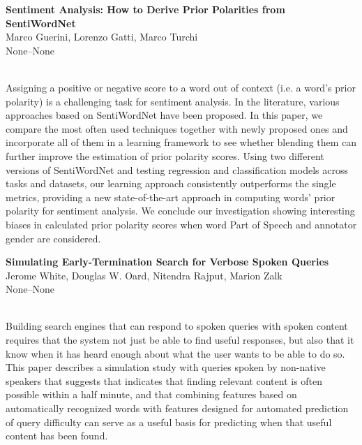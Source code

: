 \documentclass[twoside,makeidx]{book}
\renewcommand{\normalsize}{\fontsize{8}{9}\selectfont}
\renewcommand{\small}{\fontsize{7}{8}\selectfont}
\begin{document}
\begin{minipage}{\linewidth}%
\begin{center}
\textbf{\normalsize Sentiment Analysis: How to Derive Prior Polarities from SentiWordNet}\\
\normalsize  Marco Guerini,  Lorenzo Gatti,  Marco Turchi\\
{\small None--None}\\
\end{center}
\end{minipage}\\[0.5em]
\nopagebreak%
\noindent%
{\small Assigning a positive or negative score to a word out of context (i.e. a word's prior polarity) is a challenging task for sentiment analysis. In the literature, various approaches based on SentiWordNet have been proposed.  In this paper, we compare the most often used techniques together with newly proposed ones and incorporate all of them in a learning framework to see whether blending them can further improve the estimation of prior polarity scores.  Using two different versions of SentiWordNet and testing regression and classification models across tasks and datasets, our learning approach consistently outperforms the single metrics, providing a new state-of-the-art approach in computing words' prior polarity for sentiment analysis. We conclude our investigation showing interesting biases in calculated prior polarity scores when word Part of Speech and annotator gender are considered.}
\par\vspace{2em}\noindent%
\begin{minipage}{\linewidth}%
\begin{center}
\textbf{\normalsize Simulating Early-Termination Search for Verbose Spoken Queries}\\
\normalsize  Jerome White,  Douglas W. Oard,  Nitendra Rajput,  Marion Zalk\\
{\small None--None}\\
\end{center}
\end{minipage}\\[0.5em]
\nopagebreak%
\noindent%
{\small Building search engines that can respond to spoken queries with spoken content requires that the system not just be able to find useful responses, but also that it know when it has heard enough about what the user wants to be able to do so. This paper describes a simulation study with queries spoken by non-native speakers that suggests that indicates that finding relevant content is often possible within a half minute, and that combining features based on automatically recognized words with features designed for automated prediction of query difficulty can serve as a useful basis for predicting when that useful content has been found.}
\end{document}

